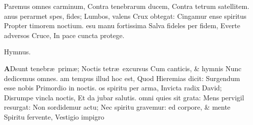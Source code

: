 \documentclass[letter,11pt]{book}
\begin{document}
\begin{multicols*}{2}
\newline Paremus omnes carminum,
\newline \indent Contra tenebrarum ducem,
\newline \indent Contra tetrum satellitem.
anus perarmet spes, fides;
\newline \indent \indent Lumbos, valens Crux obtegat:
\newline \indent Cingamur ense spiritus
\newline \indent Propter timorem noctium.
esu manu fortissima
\newline \indent Salva fideles per fidem,
\newline \indent Everte adversos Cruce,
\newline \indent In pace cuncta protege.
\vspace{-.5em} \begin{center} \color{Red} Hymnus. \end{center} \vspace{-.5em}
\lettrine[lines=2]{\bfseries \color{Red} A}{}Dsunt tenebr\ae \ prim\ae ;
\newline Noctis tetr\ae \ excursus
\newline \indent Cum canticis, \& hymnis
\newline \indent Nunc dedicemus omnes.
am tempus illud hoc est,
\newline \indent Quod Hieremias dicit:
\newline \indent Surgendum esse nobis
\newline \indent Primordio in noctis.
os spiritu per arma,
\newline \indent Invicta radix David;
\newline \indent Disrumpe vincla noctis,
\newline \indent Et da jubar salutis.
omni quies sit grata:
\newline \indent Mens pervigil resurgat:
\newline \indent Non sordidemur actu;
\newline \indent Nec spiritu gravemur:
ed corpore, \& mente
\newline \indent Spiritu fervente,
\newline \indent Vestigio impigro

\end{multicols*}
\end{document}
